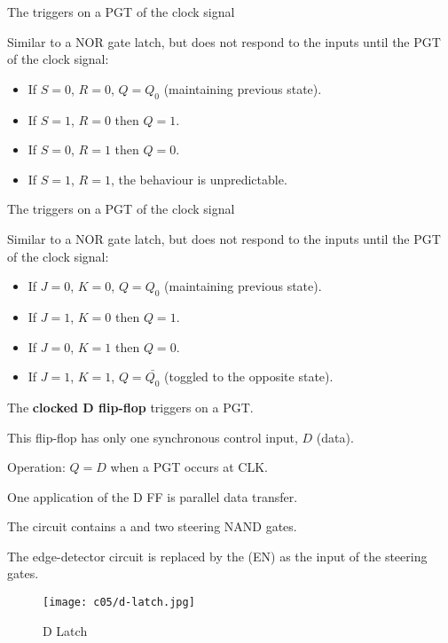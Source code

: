     \par The  triggers on a PGT of the clock signal

    \par Similar to a NOR gate latch, but does not respond to the inputs until
      the PGT of the clock signal:
    \begin{itemize}
      \item If $S = 0$, $R = 0$, $Q = Q_{0}$ (maintaining previous state).
      \item If $S = 1$, $R = 0$ then $Q = 1$.
      \item If $S = 0$, $R = 1$ then $Q = 0$.
      \item If $S = 1$, $R = 1$, the behaviour is unpredictable.
  \end{itemize}


    \par The  triggers on a PGT of the clock signal

    \par Similar to a NOR gate latch, but does not respond to the inputs until
      the PGT of the clock signal:
    \begin{itemize}
      \item If $J = 0$, $K = 0$, $Q = Q_{0}$ (maintaining previous state).
      \item If $J = 1$, $K = 0$ then $Q = 1$.
      \item If $J = 0$, $K = 1$ then $Q = 0$.
      \item If $J = 1$, $K = 1$, $Q = \bar{Q_{0}}$ (toggled to the opposite
      state).
  \end{itemize}


    \par The \textbf{clocked D flip-flop} triggers on a PGT.

    \par This flip-flop has only one synchronous control input, $D$ (data).
    \par Operation: $Q = D$ when a PGT occurs at CLK.

    \par One application of the D FF is parallel data transfer.


    \par The circuit contains a  and two steering NAND gates.
    \par The edge-detector circuit is replaced by the  (EN)
    as the input of the steering gates.
    \begin{figure}[H]
      \centering
      \texttt{[image: c05/d-latch.jpg]}
      \caption{D Latch}
    \end{figure}

